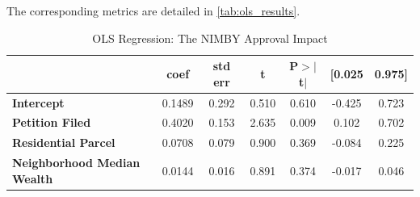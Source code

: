 

The corresponding metrics are detailed in \autoref{tab:ols_results}.

\begin{table}[h]
\centering
\caption{OLS Regression: The NIMBY Approval Impact}
\label{tab:ols_results}
\begin{center}
\begin{tabular}{lcccccc}
\toprule
 & \textbf{coef} & \textbf{std err} & \textbf{t} & \textbf{P$> |$t$|$} & \textbf{[0.025} & \textbf{0.975]} \\
\midrule
\textbf{Intercept} & 0.1489 & 0.292 & 0.510 & 0.610 & -0.425 & 0.723 \\
\textbf{Petition Filed} & 0.4020 & 0.153 & 2.635 & 0.009 & 0.102 & 0.702 \\
\textbf{Residential Parcel} & 0.0708 & 0.079 & 0.900 & 0.369 & -0.084 & 0.225 \\
\textbf{Neighborhood Median Wealth} & 0.0144 & 0.016 & 0.891 & 0.374 & -0.017 & 0.046 \\
\bottomrule
\end{tabular}
\end{center}\end{table}
